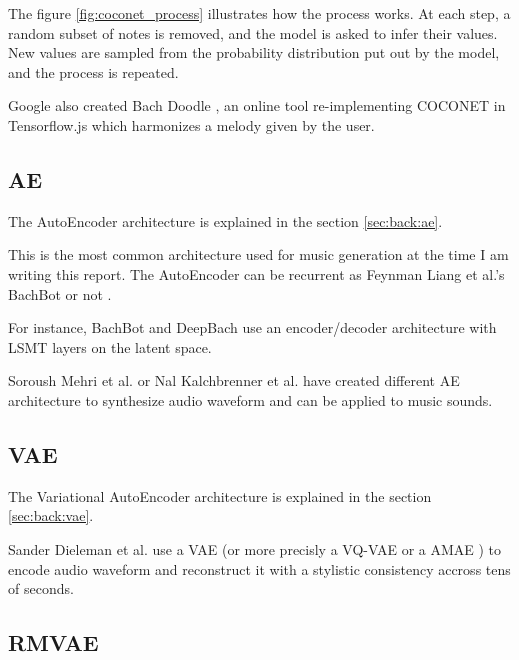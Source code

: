 \documentclass[12pt]{report}
\begin{document}
The figure \ref{fig:coconet_process} illustrates how the process works.
At each step, a random subset of notes is removed, and the model is asked to infer their values.
New values are sampled from the probability distribution put out by the model, and the process is repeated.

Google also created Bach Doodle \cite{huang_bach_2019}, an online tool re-implementing COCONET in Tensorflow.js \cite{noauthor_tensorflowjs_nodate} which harmonizes a melody given by the user.


\subsection{AE}

The AutoEncoder architecture is explained in the section \ref{sec:back:ae}.

This is the most common architecture used for music generation at the time I am writing this report.
The AutoEncoder can be recurrent  \cite{liang_automatic_2017, chuan_modeling_nodate, hadjeres_deepbach:_2016, kalchbrenner_efficient_2018, mehri_samplernn_2017} as Feynman Liang et al.'s BachBot \cite{liang_automatic_2017} or not \cite{dieleman_challenge_2018}.

For instance, BachBot \cite{liang_automatic_2017} and DeepBach \cite{hadjeres_deepbach:_2016} use an encoder/decoder architecture with LSMT layers on the latent space. \cite{chuan_modeling_nodate}

Soroush Mehri et al. \cite{mehri_samplernn_2017} or Nal Kalchbrenner et al. \cite{kalchbrenner_efficient_2018} have created different AE architecture to synthesize audio waveform and can be applied to music sounds.

\subsection{VAE}

The Variational AutoEncoder architecture is explained in the section \ref{sec:back:vae}. 

Sander Dieleman et al. \cite{dieleman_challenge_2018} use a VAE (or more precisly a VQ-VAE \cite{van_den_oord_neural_2017}  or a AMAE \cite{dieleman_challenge_2018}) to encode audio waveform and reconstruct it with a stylistic consistency accross tens of seconds.


\subsection{RMVAE}
\end{document}
